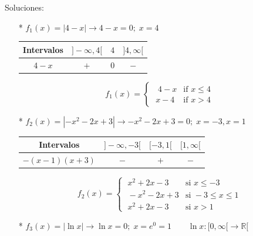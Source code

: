 {\begin{proofw}
		Soluciones:
		
		
		\begin{itemize}
			\item [*] $f_1(x)=|4-x| \to 4-x=0;\; x=4$
			
			\begin{multicols}{2} 
			
			\begin{table}[H]
			\centering
			\begin{tabular}{|c|c|c|c|}
			\hline
			Intervalos & $]-\infty,4[$ & $4$ & $]4,\infty[$ \\ \hline
			$4-x$ & $+$ & $0$ & $-$ \\ \hline
		\end{tabular}
		\end{table}
		
		\begin{equation*}
		f_1(x)=
		\begin{cases} 
		\;\;  4-x &\mbox{if } x \le 4 \\ 
		\; x-4 & \mbox{if } x >4 
		\end{cases}
		\end{equation*}
		
		\end{multicols}
		
		\item [*] $f_2(x)=|-x^2-2x+3| \to -x^2-2x+3=0; \; x=-3, x=1 $
				\begin{table}[H]
				\begin{tabular}{|c|c|c|c|}
				\hline
				Intervalos & $]-\infty, -3[$ & $[-3,1[$ & $[1, \infty[$ \\ \hline
				$-(x-1)(x+3)$ & $-$ &  $+$ & $-$ \\ \hline	
				\end{tabular}
				\end{table}
			
			\begin{equation*}
				f_2(x)=
				\begin{cases} 
				\;  x^2+2x-3 &\mbox{si } x \le -3 \\ 
				\; -x^2-2x+3 &\mbox{si } -3\le x \le 1 \\
				\;  x^2+2x-3 &\mbox{si } x>1
				\end{cases}
			\end{equation*}
				
			
			
		\item[*] $f_3(x)=|\ln x| \to \ln x=0; \; x=e^0=1 \qquad \ln x:[0,\infty[ \to  \mathbb R[$
		

\end{itemize}
\end{proofw}}
